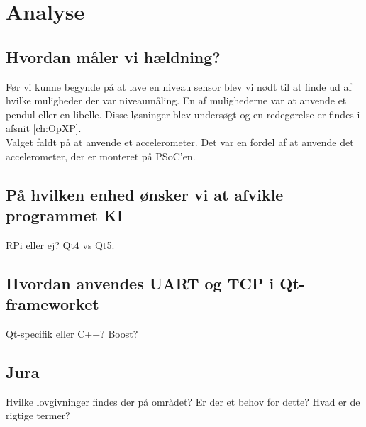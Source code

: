 \section{Analyse}
\subsection{Hvordan måler vi hældning?}
Før vi kunne begynde på at lave en niveau sensor blev vi nødt til at finde ud af hvilke muligheder der var niveaumåling. En af mulighederne var at anvende et pendul eller en libelle. Disse løsninger blev undersøgt og en redegørelse er findes i afsnit \ref{ch:OpXP}.\\
Valget faldt på at anvende et accelerometer. Det var en fordel af at anvende det accelerometer, der er monteret på PSoC'en.

\subsection{På hvilken enhed ønsker vi at afvikle programmet KI}
RPi eller ej? Qt4 vs Qt5.
\subsection{Hvordan anvendes UART og TCP i Qt-frameworket}
Qt-specifik eller C++? Boost? 
\subsection{Jura}
Hvilke lovgivninger findes der på området? Er der et behov for dette? Hvad er de rigtige termer? 